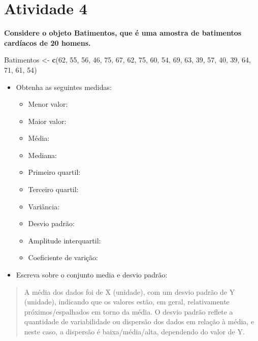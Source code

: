 \documentclass[
]{book}
\newenvironment{Shaded}{\begin{snugshade}}{\end{snugshade}}
\newcommand{\DecValTok}[1]{\textcolor[rgb]{0.00,0.00,0.81}{#1}}
\newcommand{\FunctionTok}[1]{\textcolor[rgb]{0.13,0.29,0.53}{\textbf{#1}}}
\newcommand{\NormalTok}[1]{#1}
\newcommand{\OtherTok}[1]{\textcolor[rgb]{0.56,0.35,0.01}{#1}}
\providecommand{\tightlist}{%
  \setlength{\itemsep}{0pt}\setlength{\parskip}{0pt}}
\begin{document}
\section{Atividade 4}\label{atividade-4}

\textbf{Considere o objeto Batimentos, que é uma amostra de batimentos cardíacos de 20 homens.}

\begin{Shaded}
\begin{Highlighting}[]
\NormalTok{Batimentos }\OtherTok{\textless{}{-}} \FunctionTok{c}\NormalTok{(}\DecValTok{62}\NormalTok{, }\DecValTok{55}\NormalTok{, }\DecValTok{56}\NormalTok{, }\DecValTok{46}\NormalTok{, }\DecValTok{75}\NormalTok{, }\DecValTok{67}\NormalTok{, }\DecValTok{62}\NormalTok{, }\DecValTok{75}\NormalTok{, }\DecValTok{60}\NormalTok{, }\DecValTok{54}\NormalTok{, }\DecValTok{69}\NormalTok{, }\DecValTok{63}\NormalTok{, }\DecValTok{39}\NormalTok{, }\DecValTok{57}\NormalTok{, }\DecValTok{40}\NormalTok{, }\DecValTok{39}\NormalTok{, }\DecValTok{64}\NormalTok{, }\DecValTok{71}\NormalTok{, }\DecValTok{61}\NormalTok{, }\DecValTok{54}\NormalTok{)}
\end{Highlighting}
\end{Shaded}

\begin{itemize}
\tightlist
\item
  Obtenha as seguintes medidas:

  \begin{itemize}
  \tightlist
  \item
    Menor valor:
  \item
    Maior valor:
  \item
    Média:
  \item
    Mediana:
  \item
    Primeiro quartil:
  \item
    Terceiro quartil:
  \item
    Variância:
  \item
    Desvio padrão:
  \item
    Amplitude interquartil:
  \item
    Coeficiente de varição:
  \end{itemize}
\item
  Escreva sobre o conjunto media e desvio padrão:
\end{itemize}

\begin{quote}
A média dos dados foi de X (unidade), com um desvio padrão de Y (unidade), indicando que os valores estão, em geral, relativamente próximos/espalhados em torno da média. O desvio padrão reflete a quantidade de variabilidade ou dispersão dos dados em relação à média, e neste caso, a dispersão é baixa/média/alta, dependendo do valor de Y.
\end{quote}
\end{document}
